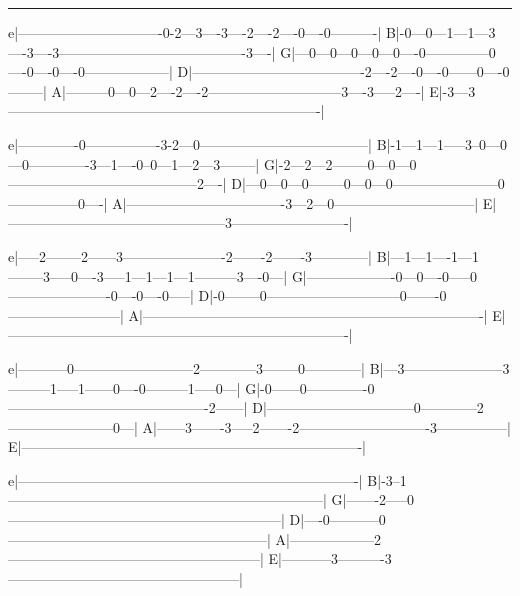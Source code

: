 \noindent\rule{\columnwidth}{1pt}

\begin{lsttab}
e|-------------------------------0-2---3----3----2----2----0----0----------|
B|-0---0---1---1---3----3----3----------------------------------------3----|
G|---0---0---0---0---0----0--------------0----0----0----0------------------|
D|-------------------------------------2----2----0----0------0----0--------|
A|---------0---0---2----2----2-----------------------------3----3-----2----|
E|-3---3-------------------------------------------------------------------|

e|-------------0----------------3-2---0------------------------------------|
B|-1---1---1-----3--0---0---0-------------3---1----0--0---1---2---3--------|
G|-2---2---2--------0---0---0-----------------------------------------2----|
D|---0---0---0--------0---0---0-----------------------0---------------0----|
A|----------------------------------3---2---0------------------------------|
E|-----------------------------------------------3-------------------------|


e|-----2--------2------3----------------------2-------2-------3------------|
B|---1---1----1---1--------3-----0----3-----1---1---1---1---------3----0---|
G|-------------------0---0----0-----0----------------------0----0----0-----|
D|-0--------0-----------------------------0-------0------------------------|
A|-------------------------------------------------------------------------|
E|-------------------------------------------------------------------------|

e|-----------0--------------------------2------------3--------0------------|
B|---3---------------------3---------1-----1------0----0---------1-----0---|
G|-0------0-------------0-------------------------------------------2------|
D|--------------------------------0------------2-----------------------0---|
A|------3-------3-----2-------2----------------------------3---------------|
E|-------------------------------------------------------------------------|

e|-------------------------------------------------------------------------|
B|-3--1--------------------------------------------------------------------|
G|-------2-----0-----------------------------------------------------------|
D|----0-----------0--------------------------------------------------------|
A|------------------2------------------------------------------------------|
E|-----------3----------3--------------------------------------------------|
\end{lsttab}
\newpage

